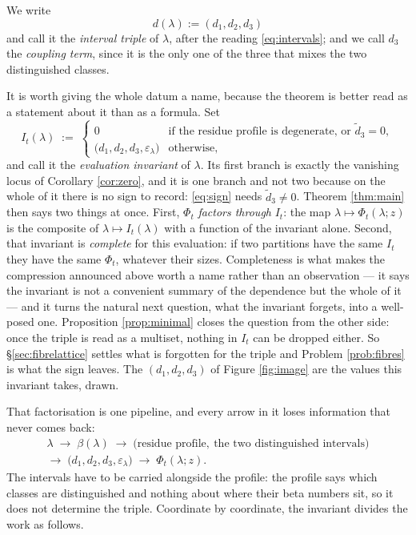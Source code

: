 \documentclass[11pt,reqno]{amsart}
\theoremstyle{plain}
\theoremstyle{definition}
\begin{document}
We write
\[
d(\lambda):=(d_1,d_2,d_3)
\]
and call it the \emph{interval triple} of $\lambda$, after the reading \eqref{eq:intervals}; and we
call $d_3$ the \emph{coupling term}, since it is the only one of the three that mixes the two
distinguished classes.

It is worth giving the whole datum a name, because the theorem is better read as a statement about it
than as a formula. Set
\begin{equation}\label{eq:invariant}
\boxed{\;\;I_t(\lambda)\;:=\;\begin{cases}
0 & \text{if the residue profile is degenerate, or }\tilde d_3=0,\\[2pt]
\bigl(d_1,d_2,d_3,\varepsilon_\lambda\bigr) & \text{otherwise},
\end{cases}\;\;}
\end{equation}
and call it the \emph{evaluation invariant} of $\lambda$. Its first branch is exactly the vanishing
locus of Corollary \ref{cor:zero}, and it is one branch and not two because on the whole of it there
is no sign to record: \eqref{eq:sign} needs $\tilde d_3\ne0$. Theorem \ref{thm:main} then says two
things at once. First, $\Phi_t$ \emph{factors through} $I_t$: the map
$\lambda\mapsto\Phi_t(\lambda;z)$ is
the composite of $\lambda\mapsto I_t(\lambda)$ with a function of the invariant alone. Second, that
invariant is \emph{complete} for this evaluation: if two partitions have the same $I_t$ they have the
same $\Phi_t$, whatever their sizes. Completeness is what makes the compression announced above worth
a name rather than an observation --- it says the invariant is not a convenient summary of the
dependence but the whole of it --- and it turns the natural next question, what the invariant
forgets, into a well-posed one. Proposition \ref{prop:minimal} closes the question from the other
side: once the triple is read as a multiset, nothing in $I_t$ can be dropped either. So
\S\ref{sec:fibrelattice} settles what is forgotten for the triple and Problem
\ref{prob:fibres} is what the sign leaves. The $(d_1,d_2,d_3)$ of Figure
\ref{fig:image} are the values this invariant takes, drawn.

That factorisation is one pipeline, and every arrow in it loses information that never comes back:
\begin{multline*}
\lambda\;\longrightarrow\;\beta(\lambda)\;\longrightarrow\;
\bigl(\text{residue profile},\ \text{the two distinguished intervals}\bigr)\\
\longrightarrow\;\bigl(d_1,d_2,d_3,\varepsilon_\lambda\bigr)\;\longrightarrow\;\Phi_t(\lambda;z).
\end{multline*}
The intervals have to be carried alongside the profile: the profile says which classes are
distinguished and nothing about where their beta numbers sit, so it does not determine the triple.
Coordinate by coordinate, the invariant divides the work as follows.
\end{document}
